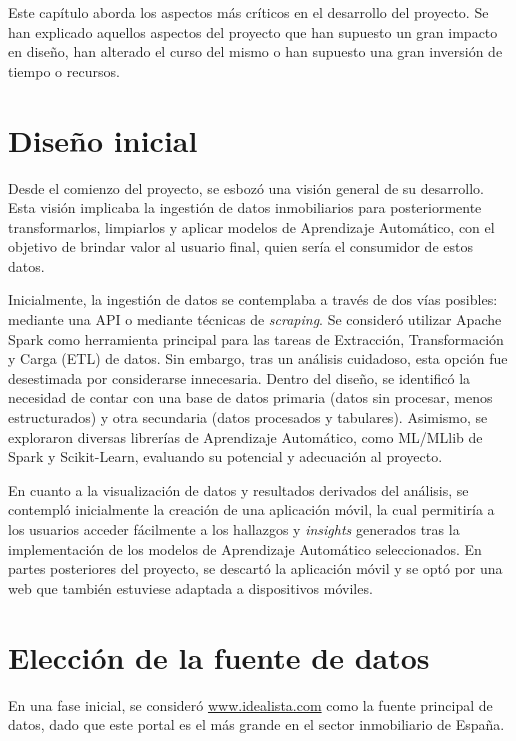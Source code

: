 
Este capítulo aborda los aspectos más críticos en el desarrollo del proyecto. Se han explicado aquellos aspectos del proyecto que han supuesto un gran impacto en diseño, han alterado el curso del mismo o han supuesto una gran inversión de tiempo o recursos.

\section{Diseño inicial}

Desde el comienzo del proyecto, se esbozó una visión general de su desarrollo. Esta visión implicaba la ingestión de datos inmobiliarios para posteriormente transformarlos, limpiarlos y aplicar modelos de Aprendizaje Automático, con el objetivo de brindar valor al usuario final, quien sería el consumidor de estos datos.

Inicialmente, la ingestión de datos se contemplaba a través de dos vías posibles: mediante una API o mediante técnicas de \textit{scraping}. Se consideró utilizar Apache Spark como herramienta principal para las tareas de Extracción, Transformación y Carga (ETL) de datos. Sin embargo, tras un análisis cuidadoso, esta opción fue desestimada por considerarse innecesaria. Dentro del diseño, se identificó la necesidad de contar con una base de datos primaria (datos sin procesar, menos estructurados) y otra secundaria (datos procesados y tabulares). Asimismo, se exploraron diversas librerías de Aprendizaje Automático, como ML/MLlib de Spark y Scikit-Learn, evaluando su potencial y adecuación al proyecto.

En cuanto a la visualización de datos y resultados derivados del análisis, se contempló inicialmente la creación de una aplicación móvil, la cual permitiría a los usuarios acceder fácilmente a los hallazgos y \textit{insights} generados tras la implementación de los modelos de Aprendizaje Automático seleccionados. En partes posteriores del proyecto, se descartó la aplicación móvil y se optó por una web que también estuviese adaptada a dispositivos móviles.


\section{Elección de la fuente de datos}

En una fase inicial, se consideró \url{www.idealista.com} como la fuente principal de datos, dado que este portal es el más grande en el sector inmobiliario de España.

